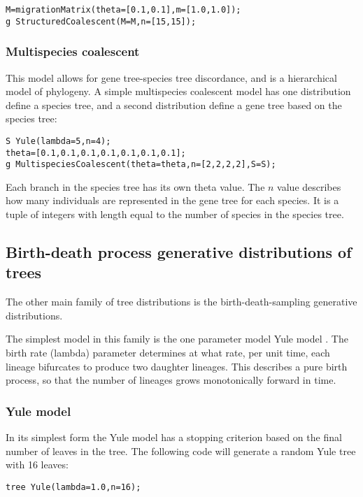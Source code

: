 \documentclass[10pt,letterpaper,table]{article}
\begin{document}
{\begin{alltt}
  M = migrationMatrix(theta=[0.1, 0.1], m=[1.0, 1.0]);
  g ~ StructuredCoalescent(M=M, n=[15, 15]);
\end{alltt}

\subsubsection*{Multispecies coalescent}

This model allows for gene tree-species tree discordance, and is a
hierarchical model of phylogeny.
A simple multispecies coalescent model has one distribution define a
species tree, and a second distribution define a gene tree based on
the species tree:

\begin{alltt}
  S ~ Yule(lambda=5, n=4);
  theta = [0.1, 0.1, 0.1, 0.1, 0.1, 0.1, 0.1];
  g ~ MultispeciesCoalescent(theta=theta, n=[2, 2, 2, 2], S=S);
\end{alltt}

Each branch in the species tree has its own theta value.
The $n$ value describes how many individuals are represented in
the gene tree for each species.
It is a tuple of integers with length equal to the number of species
in the species tree.

\subsection*{Birth-death process generative distributions of trees}

The other main family of tree distributions is the birth-death-sampling generative distributions.

The simplest model in this family is the one parameter model Yule model \cite{yule1925ii}.
The birth rate (lambda) parameter determines at what rate, per unit time, each lineage bifurcates to produce two daughter lineages.
This describes a pure birth process, so that the number of lineages grows monotonically forward in time.

\subsubsection*{Yule model}

In its simplest form the Yule model has a stopping criterion based on the final number of leaves in the tree.
The following code will generate a random Yule tree with 16 leaves:

\begin{alltt}
  tree ~ Yule(lambda=1.0, n=16);
\end{alltt}

}
\end{document}
